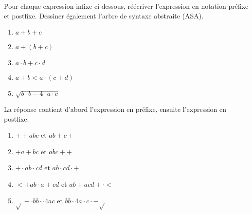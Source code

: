 \begin{Exercise}[title={Conversion préfixe, infixe, postfixe}]
  \label{ex:infixe-prefixe-postfixe}
Pour chaque expression infixe ci-dessous, réécriver l'expression en
notation préfixe et postfixe. Dessiner également l'arbre de syntaxe
abstraite (ASA).

\begin{enumerate}
\item $a + b + c$
\item $a + (b + c)$
\item $a \cdot b + c \cdot d$
\item $a + b < a \cdot (c + d)$
\item $\sqrt{b \cdot b - 4 \cdot a \cdot c}$
\end{enumerate}
\end{Exercise}

\begin{Answer}[ref={ex:infixe-prefixe-postfixe}]
La réponse contient d'abord l'expression en préfixe, ensuite l'expression en postfixe.
\begin{enumerate}
\item $+ + a b c$ et $a b + c +$
\item $+ a + b c$ et $a b c + +$
\item $+ \cdot a b \cdot c d$ et $a b \cdot c d \cdot +$ 
\item $< + a b \cdot a + c d$ et $a b + a c d + \cdot <$
\item $\sqrt{} - \cdot b b \cdot \cdot 4 a c$ et $b b \cdot 4 a \cdot c \cdot - \sqrt{}$
\end{enumerate}
\end{Answer}
